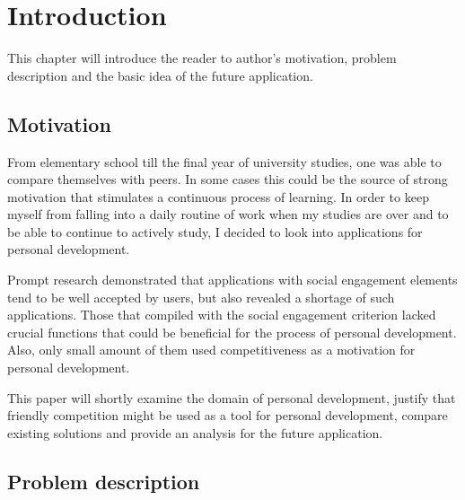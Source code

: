 

\chapter{Introduction}\label{ch:introduction}

This chapter will introduce the reader to author's motivation, problem description and the basic idea of the future application.


\section{Motivation}\label{sec:introduction-motivation}

From elementary school till the final year of university studies, one was able to compare themselves with peers.
In some cases this could be the source of strong motivation that stimulates a continuous process of learning.
In order to keep myself from falling into a daily routine of work when my
studies are over and to be able to continue to actively study, I decided to look
into applications for personal development.

Prompt research demonstrated that applications with social engagement elements tend to be well accepted by users,
but also revealed a shortage of such applications.
Those that compiled with the social engagement criterion lacked crucial functions that could be beneficial for the process of personal development.
Also, only small amount of them used competitiveness as a motivation for personal development.

This paper will shortly examine the domain of personal development, justify that friendly competition might be used as a tool for personal development,
compare existing solutions and provide an analysis for the future application.


\section{Problem description}\label{sec:problem-description}

